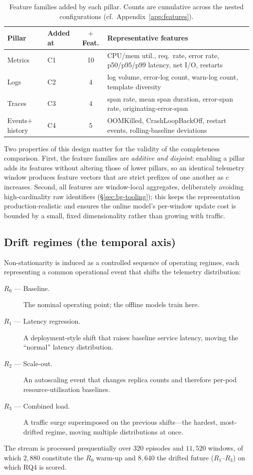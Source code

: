 \documentclass[acmsmall]{acmart}
\begin{document}
\begin{table}[t]
\caption{Feature families added by each pillar. Counts are cumulative across the nested configurations (cf.\ Appendix~\ref{app:features}).}\label{tab:features}
\begin{tabular}{@{}llcp{}@{}}
\toprule
Pillar & Added at & ${+}$Feat. & Representative features \\
\midrule
Metrics & C1 & 10 & CPU/mem util., req.\ rate, error rate, p50/p95/p99 latency, net I/O, restarts \\
Logs    & C2 & 4  & log volume, error-log count, warn-log count, template diversity \\
Traces  & C3 & 4  & span rate, mean span duration, error-span rate, originating-error-span \\
Events${+}$history & C4 & 5 & OOMKilled, CrashLoopBackOff, restart events, rolling-baseline deviations \\
\bottomrule
\end{tabular}
\end{table}

Two properties of this design matter for the validity of the completeness comparison. First, the feature families are \emph{additive and disjoint}: enabling a pillar adds its features without altering those of lower pillars, so an identical telemetry window produces feature vectors that are strict prefixes of one another as $c$ increases. Second, all features are window-local aggregates, deliberately avoiding high-cardinality raw identifiers (\S\ref{sec:bg-tooling}); this keeps the representation production-realistic and ensures the online model's per-window update cost is bounded by a small, fixed dimensionality rather than growing with traffic.

\subsection{Drift regimes (the temporal axis)}\label{sec:method-regimes}

Non-stationarity is induced as a controlled sequence of operating regimes, each representing a common operational event that shifts the telemetry distribution:
\begin{description}
  \item[$R_0$ --- Baseline.] The nominal operating point; the offline models train here.
  \item[$R_1$ --- Latency regression.] A deployment-style shift that raises baseline service latency, moving the ``normal'' latency distribution.
  \item[$R_2$ --- Scale-out.] An autoscaling event that changes replica counts and therefore per-pod resource-utilisation baselines.
  \item[$R_3$ --- Combined load.] A traffic surge superimposed on the previous shifts---the hardest, most-drifted regime, moving multiple distributions at once.
\end{description}
The stream is processed prequentially over $320$ episodes and $11{,}520$ windows, of which $2{,}880$ constitute the $R_0$ warm-up and $8{,}640$ the drifted future ($R_1$--$R_3$) on which RQ4 is scored.
\end{document}
